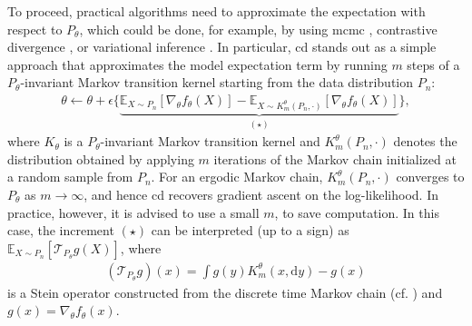 \documentclass[12pt,paper=letter]{scrreprt}
\def\mbb#1{\mathbb{#1}}
\def\E{\mbb{E}} %
\newcommand{\vtheta}{\theta}
\begin{document}
To proceed, practical algorithms need to approximate the expectation with respect to $P_\theta$, which could be done, for example, by using
\ac{mcmc} \citep[e.g.,][]{geyer1991markov}, contrastive divergence \citep{hinton2002training}, or variational inference \citep[e.g.,][]{wainwright2008graphical}.  
In particular, \ac{cd} stands out as a simple approach that approximates the model expectation term by running $m$ steps of a $P_\theta$-invariant Markov transition kernel starting from the data distribution $P_n$: 
\begin{align}\label{equ:cdgrad}
\vtheta \gets \vtheta + \epsilon \{ \underbrace{ \E_{X \sim P_n} [\nabla_\vtheta f_\theta (X)]  -  \E_{X \sim K_m^\theta(P_n , \cdot)} [\nabla_\vtheta f_\theta (X) ] }_{(\star)} \} ,
\end{align}
where $K_\theta$ is a $P_\theta$-invariant Markov transition kernel and $K_m^\theta(P_n,\cdot)$ denotes the distribution obtained by applying $m$ iterations of the Markov chain initialized at a random sample from $P_n$.
For an ergodic Markov chain, $K_m^\theta(P_n , \cdot)$ converges to $P_\theta$ as $m \rightarrow \infty$, and hence \ac{cd} recovers gradient ascent on the log-likelihood. 
In practice, however, it is advised to use a small $m$, to save computation. 
In this case, the increment $(\star)$ can be interpreted (up to a sign) as $\E_{X \sim P_n} [\mathcal{T}_{P_\theta} g(X)]$, where
\begin{align*}
    (\mathcal{T}_{P_\theta} g)(x) = \int g(y) K_m^\theta(x,\mathrm{d}y) - g(x)
\end{align*}
is a Stein operator constructed from the discrete time Markov chain (cf. ) and $g(x) = \nabla_\vtheta f_\theta (x)$.
\end{document}
